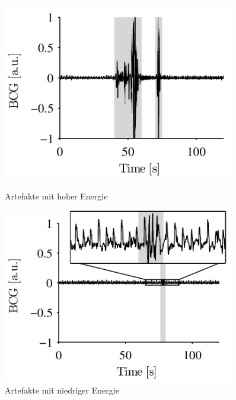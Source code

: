 	\begin{figure}[H]
		\centering
		\begin{minipage}{0.4\linewidth}
			\centering
      		\includegraphics[width=0.9\textwidth]{pic/high-energy-artifacts.png}
			\caption[Artefakte mit hoher Energie]{Artefakte mit hoher Energie}
			\label{fig:high-energy-artifact}
    	\end{minipage}
    	\hfill
    	\begin{minipage}{0.4\linewidth}
    		\centering
      		\includegraphics[width=0.9\textwidth]{pic/low-energy-artifacts.png}
			\caption[Artefakte mit niedriger Energie]{Artefakte mit niedriger Energie}
			\label{fig:low-energy-artifact}
    	\end{minipage}
	\end{figure}
	
